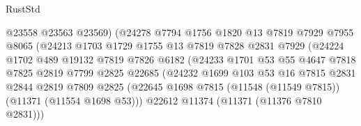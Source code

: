 \begin{lexlean}{RustStd}
\begin{coremodule}
                                  @23558
                                  @23563
                                  @23569)
                                (@24278
                                  @7794
                                  @1756
                                  @1820
                                  @13
                                  @7819
                                  @7929
                                  @7955
                                  @8065
                                  (@24213
                                    @1703
                                    @1729
                                    @1755
                                    @13
                                    @7819
                                    @7828
                                    @2831
                                    @7929
                                    (@24224
                                      @1702
                                      @489
                                      @19132
                                      @7819
                                      @7826
                                      @6182
                                      (@24233
                                        @1701
                                        @53
                                        @55
                                        @4647
                                        @7818
                                        @7825
                                        @2819
                                        @7799
                                        @2825
                                        @22685
                                        (@24232
                                          @1699
                                          @103
                                          @53
                                          @16
                                          @7815
                                          @2831
                                          @2844
                                          @2819
                                          @7809
                                          @2825
                                          (@22645
                                            @1698
                                            @7815
                                            (@11548 (@11549 @7815))
                                            (@11371 (@11554 @1698 @53)))
                                          @22612
                                          @11374
                                          (@11371 (@11376 @7810 @2831)))

\end{coremodule}
\end{lexlean}
